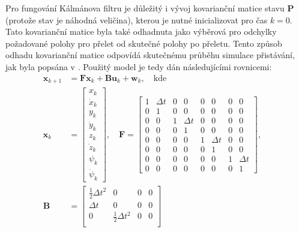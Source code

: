         Pro fungování Kálmánova filtru je důležitý i vývoj kovarianční matice stavu $\mathbf{P}$ (protože stav je náhodná veličina), kterou je nutné inicializovat pro čas $k=0$. Tato kovarianční matice byla také odhadnuta jako výběrová pro odchylky požadované polohy pro přelet od skutečné polohy po přeletu. Tento způsob odhadu kovarianční matice odpovídá skutečnému průběhu simulace přistávání, jak byla popsána v . Použitý model je tedy dán následujícími rovnicemi:
        \begin{align}
            \mathbf{x}_{k+1} &= \mathbf{Fx}_k + \mathbf{Bu}_k + \mathbf{w}_k,\quad\mathrm{kde} \label{eq:kalmanx} \\
            \mathbf{x}_k &= \begin{bmatrix}
                x_k \\ \dot x_k \\ y_k \\ \dot y_k \\ z_k \\ \dot z_k \\ \psi_k \\ \dot\psi_k
            \end{bmatrix}, \quad \mathbf{F} = \begin{bmatrix}
                1 & \Delta t & 0 &        0 & 0 & 0        & 0 & 0 \\
                0 & 1        & 0 &        0 & 0 & 0        & 0 & 0 \\
                0 & 0        & 1 & \Delta t & 0 & 0        & 0 & 0 \\
                0 & 0        & 0 & 1        & 0 & 0        & 0 & 0 \\
                0 & 0        & 0 & 0        & 1 & \Delta t & 0 & 0 \\
                0 & 0        & 0 & 0        & 0 & 1        & 0 & 0 \\
                0 & 0        & 0 & 0        & 0 & 0        & 1 & \Delta t\\
                0 & 0        & 0 & 0        & 0 & 0        & 0 & 1
            \end{bmatrix}, \quad \\
            \mathbf{B} &= \begin{bmatrix}
                \frac{1}{2}\Delta t^2 & 0 & 0 & 0 \\
                \Delta t & 0 & 0 & 0 \\
                0 & \frac{1}{2}\Delta t^2 & 0 & 0 \\

\end{bmatrix}
\end{align}
